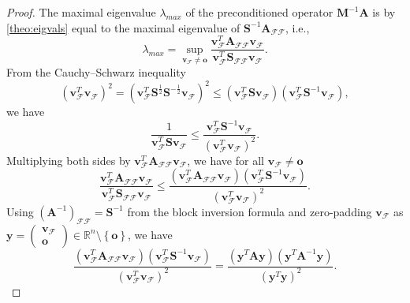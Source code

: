 \documentclass[10pt,a4paper]{amsart}
\newcommand{\MA}{\bm{A}}
\newcommand{\MM}{\bm{M}}
\newcommand{\MS}{\bm{S}}
\newcommand{\Vo}{\bm{o}}
\newcommand{\Vv}{\bm{v}}
\newcommand{\Vy}{\bm{y}}
\begin{document}
\begin{proof}
  The maximal eigenvalue $\lambda_{max}$ of the preconditioned operator $\MM^{-1}\MA$ is by \cref{theo:eigvals} equal to the maximal eigenvalue of $\MS^{-1}\MA_{\mathcal{FF}}$, i.e.,
  \begin{equation*}
    \lambda_{max} = \sup_{\Vv_{\mathcal{F}} \neq \Vo} \frac{\Vv_{\mathcal{F}}^{T}\MA_{\mathcal{FF}}\Vv_{\mathcal{F}}}{\Vv_{\mathcal{F}}^{T}\MS_{\mathcal{FF}}\Vv_{\mathcal{F}}}.
  \end{equation*}
  From the Cauchy--Schwarz inequality
  \begin{equation}
    \label{eq:cs}
    \left(\Vv_{\mathcal{F}}^{T}\Vv_{\mathcal{F}}\right)^{2} = \left(\Vv_{\mathcal{F}}^{T}\MS^{\frac{1}{2}}\MS^{-\frac{1}{2}}\Vv_{\mathcal{F}}\right)^{2} \leq \left(\Vv_{\mathcal{F}}^{T}\MS\Vv_{\mathcal{F}}\right) \left(\Vv_{\mathcal{F}}^{T}\MS^{-1}\Vv_{\mathcal{F}}\right),
  \end{equation}
  we have
  \begin{equation*}
    \frac{1}{\Vv_{\mathcal{F}}^{T}\MS\Vv_{\mathcal{F}}} \leq \frac{\Vv_{\mathcal{F}}^{T}\MS^{-1}\Vv_{\mathcal{F}}}{\left(\Vv_{\mathcal{F}}^{T}\Vv_{\mathcal{F}}\right)^{2}}.
  \end{equation*}
  Multiplying both sides by $\Vv_{\mathcal{F}}^{T}\MA_{\mathcal{FF}}\Vv_{\mathcal{F}}$, we have for all $\Vv_{\mathcal{F}} \neq \Vo$
  \begin{equation*}
    \frac{\Vv_{\mathcal{F}}^{T}\MA_{\mathcal{FF}}\Vv_{\mathcal{F}}}{\Vv_{\mathcal{F}}^{T}\MS_{\mathcal{FF}}\Vv_{\mathcal{F}}} \leq
    \frac{\left(\Vv_{\mathcal{F}}^{T}\MA_{\mathcal{FF}}\Vv_{\mathcal{F}}\right) \left(\Vv_{\mathcal{F}}^{T}\MS^{-1}\Vv_{\mathcal{F}}\right)}{\left(\Vv_{\mathcal{F}}^{T}\Vv_{\mathcal{F}}\right)^{2}}.
  \end{equation*}
  Using $\left(\MA^{-1}\right)_\mathcal{FF} = \MS^{-1}$ from the block inversion formula and zero-padding $\Vv_{\mathcal{F}}$ as $\Vy = \begin{pmatrix} \Vv_{\mathcal{F}}\\ \Vo \end{pmatrix} \in \mathbb{R}^{n} \setminus\left\{\Vo\right\}$, we have
  \begin{equation*}
    \frac{\left(\Vv_{\mathcal{F}}^{T}\MA_{\mathcal{FF}}\Vv_{\mathcal{F}}\right) \left(\Vv_{\mathcal{F}}^{T}\MS^{-1}\Vv_{\mathcal{F}}\right)}{\left(\Vv_{\mathcal{F}}^{T}\Vv_{\mathcal{F}}\right)^{2}} =
    \frac{\left(\Vy^{T}\MA\Vy\right) \left(\Vy^{T}\MA^{-1}\Vy\right)}{\left(\Vy^{T}\Vy\right)^{2}}.
  \end{equation*}

\end{proof}
\end{document}
